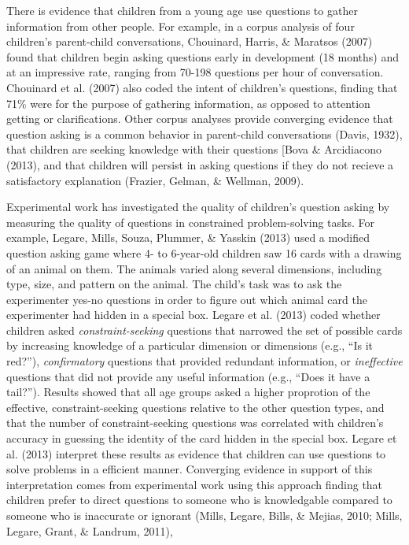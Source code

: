 \documentclass[a4paper,man,apacite,floatsintext]{apa6}
\begin{document}
There is evidence that children from a young age use questions to gather
information from other people. For example, in a corpus analysis of four
children's parent-child conversations, Chouinard, Harris, \& Maratsos
(2007) found that children begin asking questions early in development
(18 months) and at an impressive rate, ranging from 70-198 questions per
hour of conversation. Chouinard et al. (2007) also coded the intent of
children's questions, finding that 71\% were for the purpose of
gathering information, as opposed to attention getting or
clarifications. Other corpus analyses provide converging evidence that
question asking is a common behavior in parent-child conversations
(Davis, 1932), that children are seeking knowledge with their questions
{[}Bova \& Arcidiacono (2013), and that children will persist in asking
questions if they do not recieve a satisfactory explanation (Frazier,
Gelman, \& Wellman, 2009).

Experimental work has investigated the quality of children's question
asking by measuring the quality of questions in constrained
problem-solving tasks. For example, Legare, Mills, Souza, Plummer, \&
Yasskin (2013) used a modified question asking game where 4- to
6-year-old children saw 16 cards with a drawing of an animal on them.
The animals varied along several dimensions, including type, size, and
pattern on the animal. The child's task was to ask the experimenter
yes-no questions in order to figure out which animal card the
experimenter had hidden in a special box. Legare et al. (2013) coded
whether children asked \emph{constraint-seeking} questions that narrowed
the set of possible cards by increasing knowledge of a particular
dimension or dimensions (e.g., ``Is it red?''), \emph{confirmatory}
questions that provided redundant information, or \emph{ineffective}
questions that did not provide any useful information (e.g., ``Does it
have a tail?''). Results showed that all age groups asked a higher
proprotion of the effective, constraint-seeking questions relative to
the other question types, and that the number of constraint-seeking
questions was correlated with children's accuracy in guessing the
identity of the card hidden in the special box. Legare et al. (2013)
interpret these results as evidence that children can use questions to
solve problems in a efficient manner. Converging evidence in support of
this interpretation comes from experimental work using this approach
finding that children prefer to direct questions to someone who is
knowledgable compared to someone who is inaccurate or ignorant (Mills,
Legare, Bills, \& Mejias, 2010; Mills, Legare, Grant, \& Landrum, 2011),
\end{document}

